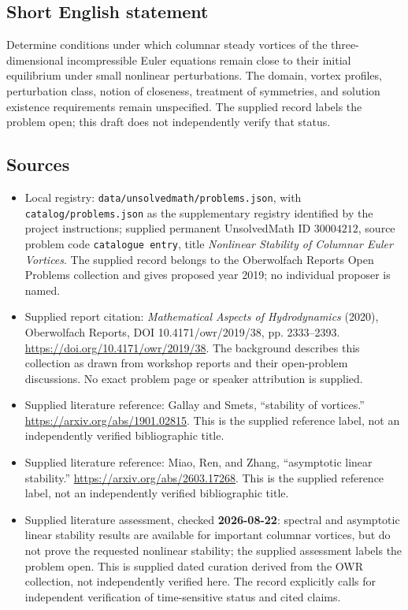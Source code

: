 \documentclass[11pt]{article}
\begin{document}
\subsection{Short English statement}
Determine conditions under which columnar steady vortices of the three-dimensional incompressible Euler equations remain close to their initial equilibrium under small nonlinear perturbations. The domain, vortex profiles, perturbation class, notion of closeness, treatment of symmetries, and solution existence requirements remain unspecified. The supplied record labels the problem open; this draft does not independently verify that status.
\subsection{Sources}
\begin{itemize}
\item Local registry: \texttt{data/unsolvedmath/problems.json}, with \texttt{catalog/problems.json} as the supplementary registry identified by the project instructions; supplied permanent UnsolvedMath ID \(30004212\), source problem code \texttt{catalogue entry}, title \emph{Nonlinear Stability of Columnar Euler Vortices}. The supplied record belongs to the Oberwolfach Reports Open Problems collection and gives proposed year 2019; no individual proposer is named.
\item Supplied report citation: \emph{Mathematical Aspects of Hydrodynamics} (2020), Oberwolfach Reports, DOI 10.4171/owr/2019/38, pp. 2333--2393. \url{https://doi.org/10.4171/owr/2019/38}. The background describes this collection as drawn from workshop reports and their open-problem discussions. No exact problem page or speaker attribution is supplied.
\item Supplied literature reference: Gallay and Smets, ``stability of vortices.'' \url{https://arxiv.org/abs/1901.02815}. This is the supplied reference label, not an independently verified bibliographic title.
\item Supplied literature reference: Miao, Ren, and Zhang, ``asymptotic linear stability.'' \url{https://arxiv.org/abs/2603.17268}. This is the supplied reference label, not an independently verified bibliographic title.
\item Supplied literature assessment, checked \textbf{2026-08-22}: spectral and asymptotic linear stability results are available for important columnar vortices, but do not prove the requested nonlinear stability; the supplied assessment labels the problem open. This is supplied dated curation derived from the OWR collection, not independently verified here. The record explicitly calls for independent verification of time-sensitive status and cited claims.
\end{itemize}
\end{document}
